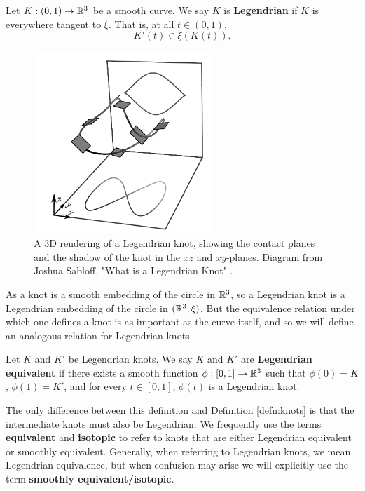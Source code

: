 \begin{definition}
    Let $K: (0, 1) \to \mathbb{R}^3$ be a smooth curve. We say $K$ is \textbf{Legendrian} if $K$ is everywhere tangent to $\xi$. That is, at all $t \in (0, 1)$,
    \[
        K'(t) \in \xi(K(t)).
    \]
\end{definition}

\begin{figure}
    \centering
    \includegraphics[width=0.6\textwidth]{images/Sabloff-3D.pdf}
    \caption{A 3D rendering of a Legendrian knot, showing the contact planes and the shadow of the knot in the $xz$ and $xy$-planes. Diagram from Joshua Sabloff, "What is a Legendrian Knot" \cite{sabloff-whatis}.}
    \label{fig:sabloff-3d}
\end{figure}

As a knot is a smooth embedding of the circle in $\mathbb{R}^3$, so a Legendrian knot is a Legendrian embedding of the circle in $(\mathbb{R}^3, \xi)$. But the equivalence relation under which one defines a knot is as important as the curve itself, and so we will define an analogous relation for Legendrian knots. 

\begin{definition}
    Let $K$ and $K'$ be Legendrian knots. We say $K$ and $K'$ are \textbf{Legendrian equivalent} if there exists a smooth function ${\phi: [0, 1] \to \mathbb{R}^3}$ such that
    ${\phi(0) = K}$, ${\phi(1) = K'}$, and for every ${t \in [0, 1]}$, $\phi(t)$ is a Legendrian knot.
\end{definition}

The only difference between this definition and Definition \ref{defn:knots} is that the intermediate knots must also be Legendrian.
We frequently use the terms \textbf{equivalent} and \textbf{isotopic} to refer to knots that are either Legendrian equivalent or smoothly equivalent. Generally, when referring to Legendrian knots, we mean Legendrian equivalence, but when confusion may arise we will explicitly use the term \textbf{smoothly equivalent/isotopic}.

